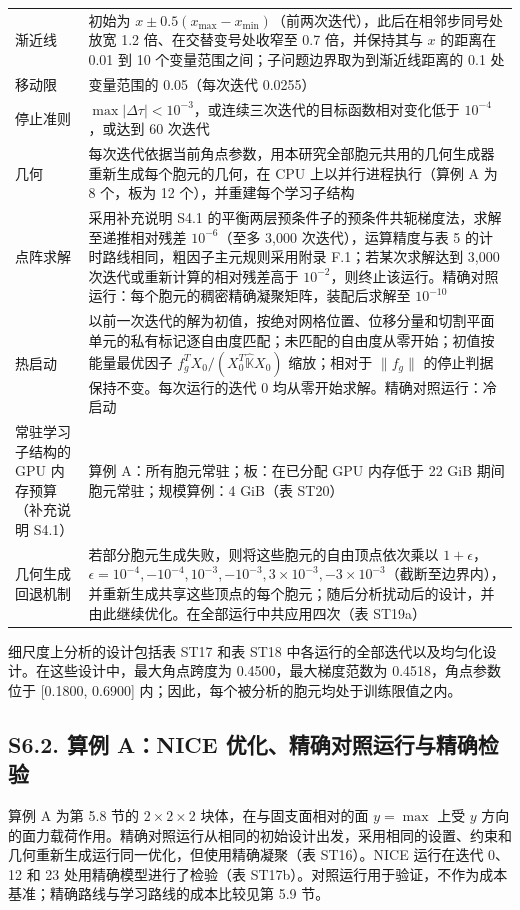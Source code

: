 \documentclass[preprint,12pt,authoryear]{elsarticle}
\begin{document}
{\begin{longtable}[]{@{}
  >{\raggedright\arraybackslash}p{}
  >{\raggedright\arraybackslash}p{}@{}}
渐近线 & 初始为 \(x\pm0.5(x_{\max}-x_{\min})\)（前两次迭代），此后在相邻步同号处放宽 1.2 倍、在交替变号处收窄至 0.7 倍，并保持其与 \(x\) 的距离在 0.01 到 10 个变量范围之间；子问题边界取为到渐近线距离的 0.1 处 \\
移动限 & 变量范围的 0.05（每次迭代 0.0255） \\
停止准则 & \(\max\lvert\Delta\tau\rvert<10^{-3}\)，或连续三次迭代的目标函数相对变化低于 \(10^{-4}\)，或达到 60 次迭代 \\
几何 & 每次迭代依据当前角点参数，用本研究全部胞元共用的几何生成器重新生成每个胞元的几何，在 CPU 上以并行进程执行（算例 A 为 8 个，板为 12 个），并重建每个学习子结构 \\
点阵求解 & 采用补充说明 S4.1 的平衡两层预条件子的预条件共轭梯度法，求解至递推相对残差 \(10^{-6}\)（至多 3,000 次迭代），运算精度与表 5 的计时路线相同，粗因子主元规则采用附录 F.1；若某次求解达到 3,000 次迭代或重新计算的相对残差高于 \(10^{-2}\)，则终止该运行。精确对照运行：每个胞元的稠密精确凝聚矩阵，装配后求解至 \(10^{-10}\) \\
热启动 & 以前一次迭代的解为初值，按绝对网格位置、位移分量和切割平面单元的私有标记逐自由度匹配；未匹配的自由度从零开始；初值按能量最优因子 \(f_g^TX_0/(X_0^T\widehat{\mathbb K}X_0)\) 缩放；相对于 \(\lVert f_g\rVert\) 的停止判据保持不变。每次运行的迭代 0 均从零开始求解。精确对照运行：冷启动 \\
常驻学习子结构的 GPU 内存预算（补充说明 S4.1） & 算例 A：所有胞元常驻；板：在已分配 GPU 内存低于 22 GiB 期间胞元常驻；规模算例：4 GiB（表 ST20） \\
几何生成回退机制 & 若部分胞元生成失败，则将这些胞元的自由顶点依次乘以 \(1+\epsilon\)，\(\epsilon=10^{-4},-10^{-4},10^{-3},-10^{-3},3\times10^{-3},-3\times10^{-3}\)（截断至边界内），并重新生成共享这些顶点的每个胞元；随后分析扰动后的设计，并由此继续优化。在全部运行中共应用四次（表 ST19a） \\
\end{longtable}}

细尺度上分析的设计包括表 ST17 和表 ST18 中各运行的全部迭代以及均匀化设计。在这些设计中，最大角点跨度为 0.4500，最大梯度范数为 0.4518，角点参数位于 {[}0.1800, 0.6900{]} 内；因此，每个被分析的胞元均处于训练限值之内。

\subsection{S6.2. 算例 A：NICE 优化、精确对照运行与精确检验}

算例 A 为第 5.8 节的 \(2\times2\times2\) 块体，在与固支面相对的面 \(y=\max\) 上受 \(y\) 方向的面力载荷作用。精确对照运行从相同的初始设计出发，采用相同的设置、约束和几何重新生成运行同一优化，但使用精确凝聚（表 ST16）。NICE 运行在迭代 0、12 和 23 处用精确模型进行了检验（表 ST17b）。对照运行用于验证，不作为成本基准；精确路线与学习路线的成本比较见第 5.9 节。
\end{document}
